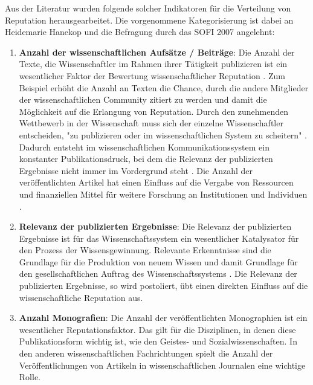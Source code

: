 Aus der Literatur wurden folgende solcher Indikatoren für die Verteilung von Reputation herausgearbeitet. Die vorgenommene Kategorisierung ist dabei an Heidemarie Hanekop \cite{hanekop_2008} und die Befragung durch das SOFI 2007 \cite{Hanekop_Wittke_2007_Fragebogen} angelehnt:
\begin{enumerate}
\item \textbf{Anzahl der wissenschaftlichen Aufsätze / Beiträge}: Die Anzahl der Texte, die Wissenschaftler im Rahmen ihrer Tätigkeit publizieren ist ein wesentlicher Faktor der Bewertung wissenschaftlicher Reputation \cite{Warnke_2012} \cite{CLAPHAM_2005} \cite{luhmann_1970_selbststeuerung}. Zum Beispiel erhöht die Anzahl an Texten die Chance, durch die andere Mitglieder der wissenschaftlichen Community zitiert zu werden und damit die Möglichkeit auf die Erlangung von Reputation. Durch den zunehmenden Wettbewerb in der Wissenschaft muss sich der einzelne Wissenschaftler entscheiden, "zu publizieren oder im wissenschaftlichen System zu scheitern" \cite{Suess_2006}. Dadurch entsteht im wissenschaftlichen Kommunikationssystem ein konstanter Publikationsdruck, bei dem die Relevanz der publizierten Ergebnisse nicht immer im Vordergrund steht \cite{hamilton_1990_publishing}. Die Anzahl der veröffentlichten Artikel hat einen Einfluss auf die Vergabe von Ressourcen und finanziellen Mittel für weitere Forschung an Institutionen und Individuen \cite{Warnke_2012} \cite{hamilton_1990_publishing}.
\item \textbf{Relevanz der publizierten Ergebnisse}: Die Relevanz der publizierten Ergebnisse ist für das Wissenschaftssystem ein wesentlicher Katalysator für den Prozess der Wissensgewinnung. Relevante Erkenntnisse sind die Grundlage für die Produktion von neuem Wissen und damit Grundlage für den gesellschaftlichen Auftrag des Wissenschaftssystems \cite{hanekop_2008}. Die Relevanz der publizierten Ergebnisse, so wird postoliert, übt einen direkten Einfluss auf die wissenschaftliche Reputation aus.
\item \textbf{Anzahl Monografien}: Die Anzahl der veröffentlichten Monographien ist ein wesentlicher Reputationsfaktor. Das gilt für die Disziplinen, in denen diese Publikationsform wichtig ist, wie den Geistes- und Sozialwissenschaften. In den anderen wissenschaftlichen Fachrichtungen spielt die Anzahl der Veröffentlichungen von Artikeln in wissenschaftlichen Journalen eine wichtige Rolle.

\end{enumerate}
